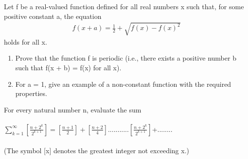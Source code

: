 \item Let f be a real-valued function defined for all real numbers x such that, for some positive constant a, the equation
\begin{align}
f(x + a) = \frac{1}{2} + \sqrt{f(x) - f(x)^2}
\end{align}
holds for all x.
\begin{enumerate}
\item Prove that the function f is periodic (i.e., there exists a positive number b such that f(x + b) = f(x) for all x).
\item For a = 1, give an example of a non-constant function with the required properties.
\end{enumerate}

\item For every natural number n, evaluate the sum\\
\\$\sum_{k=1}^{\infty}[\frac{n+2^{k}}{2^{k+1}}] = [\frac{n+1}{2}] + [\frac{n+2}{4}]...........[\frac{n+2^{k}}{2^{k+1}}]$+........\\
\\(The symbol [x] denotes the greatest integer not exceeding x.)


